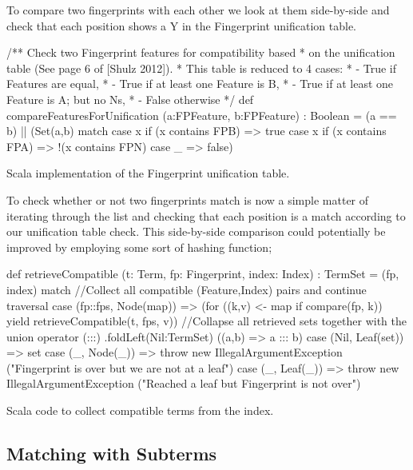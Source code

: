 To compare two fingerprints with each other we look at them side-by-side and check
that each position shows a Y in the Fingerprint unification table. 
\begin{listing}[H]
\begin{scalacode}
 /** Check two Fingerprint features for compatibility based
   * on the unification table (See page 6 of [Shulz 2012]).
   * This table is reduced to 4 cases:
   *  - True if Features are equal,
   *  - True if at least one Feature is B,
   *  - True if at least one Feature is A; but no Ns,
   *  - False otherwise  */
  def compareFeaturesForUnification
         (a:FPFeature, b:FPFeature) : Boolean =
  (a == b) || 
  (Set(a,b) match {
    case x if (x contains FPB) => true
    case x if (x contains FPA) => !(x contains FPN)
    case _ => false})
\end{scalacode}
\caption{Scala implementation of the Fingerprint unification table. \protect\cite[p6]{shulz12}}
\label{lst:unitable}
\end{listing}

To check whether or not two fingerprints match is now a simple matter of iterating
through the list and checking that each position is a match according to our unification
table check. This side-by-side comparison could potentially be improved by employing
some sort of hashing function; 

\begin{listing}[H]
\begin{scalacode}
def retrieveCompatible
  (t: Term, fp: Fingerprint, index: Index) : TermSet =
  (fp, index) match {
//Collect all compatible (Feature,Index) pairs and continue traversal
    case (fp::fps, Node(map)) => (for ((k,v) <- map if compare(fp, k))
        yield retrieveCompatible(t, fps, v))
//Collapse all retrieved sets together with the union operator (:::)
      .foldLeft(Nil:TermSet) ((a,b) => a ::: b)
    case (Nil, Leaf(set)) => set
    case (_, Node(_)) => throw new IllegalArgumentException
         ("Fingerprint is over but we are not at a leaf")
    case (_, Leaf(_)) => throw new IllegalArgumentException
         ("Reached a leaf but Fingerprint is not over")
  }
\end{scalacode}
\caption{Scala code to collect compatible terms from the index.}
\label{lst:retrieve}
\end{listing}

\subsection{Matching with Subterms}

